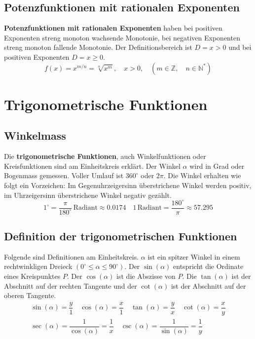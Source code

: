 \subsection{Potenzfunktionen mit rationalen Exponenten} 
\textbf{Potenzfunktionen mit rationalen Exponenten} haben bei positiven Exponenten streng monoton wachsende Monotonie, bei negativen Exponenten streng monoton fallende Monotonie. Der Definitionsbereich ist $D=x>0$ und bei positiven Exponenten $D=x\geq 0$.
\begin{equation}
\boxed{f\left(x\right)=x^{m/n}=\sqrt[n]{x^m},\quad x>0,\quad \left(m\in \mathbb{Z},\quad n\in \mathbb{N}^*\right)}
\end{equation}
\section{Trigonometrische Funktionen}
\subsection{Winkelmass}
Die \textbf{trigonometrische Funktionen}, auch Winkelfunktionen oder Kreisfunktionen sind am Einheitskreis erklärt. Der Winkel $\alpha$ wird in Grad oder Bogenmass gemessen. Voller Umlauf ist $360^{\circ}$ oder $2\pi$. Die Winkel erhalten wie folgt ein Vorzeichen: Im Gegenuhrzeigersinn überstrichene Winkel werden positiv, im Uhrzeigersinn überstrichene Winkel negativ gezählt.
\begin{equation} 
\boxed{1^{\circ}=\dfrac{\pi}{180^{\circ}}\,\text{Radiant}\approx 0.0174}\quad
\boxed{1\,\text{Radiant}=\dfrac{180^{\circ}}{\pi}\approx 57.295}
\end{equation} 
\subsection{Definition der trigonometrischen Funktionen}
Folgende sind Definitionen am Einheitskreis. $\alpha$ ist ein spitzer Winkel in einem rechtwinkligen Dreieck $\left(0^{\circ}\leq \alpha \leq 90^{\circ}\right)$. Der $\sin\left(\alpha\right)$ entspricht die Ordinate eines Kreispunktes $P$. Der $\cos\left(\alpha\right)$ ist die Abszisse von $P$. Die $\tan\left(\alpha\right)$ ist der Abschnitt auf der rechten Tangente und der $\cot\left(\alpha\right)$ ist der Abschnitt auf der oberen Tangente.
\begin{equation}
\begin{array}{l}
\boxed{\sin\left(\alpha\right)=\dfrac{y}{1}}\quad \boxed{\cos\left(\alpha\right)=\dfrac{x}{1}}\quad \boxed{\tan\left(\alpha\right)=\dfrac{y}{x}}\quad \boxed{\cot\left(\alpha\right)=\dfrac{x}{y}}\\\boxed{\sec\left(\alpha\right)=\dfrac{1}{\cos\left(\alpha\right)}=\dfrac{1}{x}}\quad \boxed{\csc\left(\alpha\right)=\dfrac{1}{\sin\left(\alpha\right)}=\dfrac{1}{y}}
\end{array}
\end{equation}
